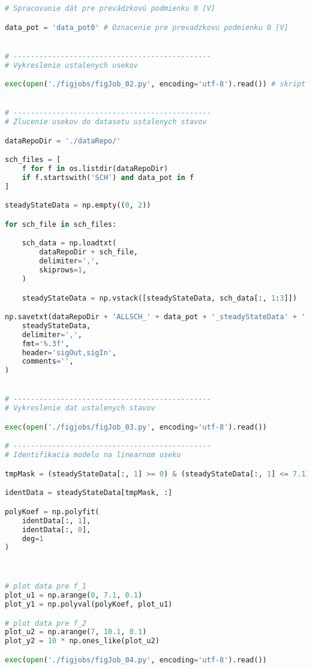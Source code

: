 
\begin{lstlisting}[language=Python, caption=Súbor \lstinline|../dataJob_SSChar.ipynb cell:05|]
# Spracovanie dát pre prevádzkovú podmienku 0 [V]

data_pot = 'data_pot0' # Oznacenie pre prevadzkovu podmienku 0 [V]


# ----------------------------------------------
# Vykreslenie ustalenych usekov

exec(open('./figjobs/figJob_02.py', encoding='utf-8').read()) # skript je v subore figJob_02.py


# ----------------------------------------------
# Zlucenie usekov do datasetu ustalenych stavov

dataRepoDir = './dataRepo/'

sch_files = [
    f for f in os.listdir(dataRepoDir)
    if f.startswith('SCH') and data_pot in f
]

steadyStateData = np.empty((0, 2))

for sch_file in sch_files:

    sch_data = np.loadtxt(
        dataRepoDir + sch_file,
        delimiter=',',
        skiprows=1,
    )

    steadyStateData = np.vstack([steadyStateData, sch_data[:, 1:3]])

np.savetxt(dataRepoDir + 'ALLSCH_' + data_pot + '_steadyStateData' + '.csv',
    steadyStateData,
    delimiter=',',
    fmt='%.3f',
    header='sigOut,sigIn',
    comments='',
)


# ----------------------------------------------
# Vykreslenie dat ustalenych stavov

exec(open('./figjobs/figJob_03.py', encoding='utf-8').read())

# ----------------------------------------------
# Identifikacia modelu na linearnom useku

tmpMask = (steadyStateData[:, 1] >= 0) & (steadyStateData[:, 1] <= 7.1)

identData = steadyStateData[tmpMask, :]

polyKoef = np.polyfit(
    identData[:, 1],
    identData[:, 0],
    deg=1
)



# plot data pre f_1
plot_u1 = np.arange(0, 7.1, 0.1)
plot_y1 = np.polyval(polyKoef, plot_u1)

# plot data pre f_2
plot_u2 = np.arange(7, 10.1, 0.1)
plot_y2 = 10 * np.ones_like(plot_u2)

exec(open('./figjobs/figJob_04.py', encoding='utf-8').read()) \end{lstlisting}

